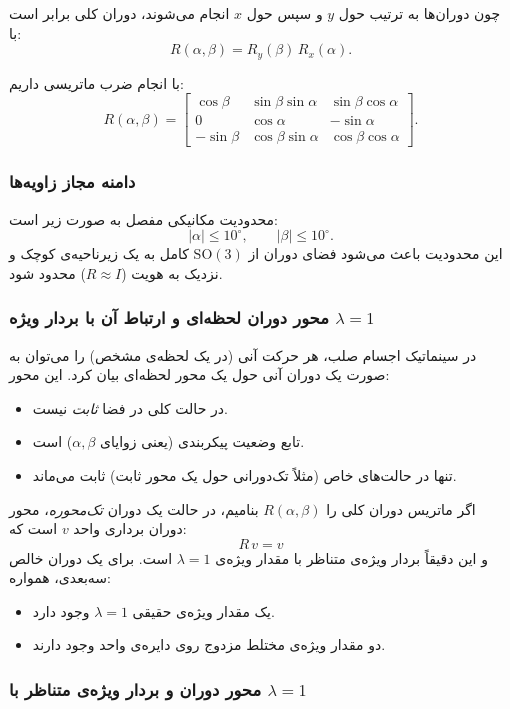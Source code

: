 \documentclass{article}
\begin{document}
چون دوران‌ها به ترتیب حول \(y\) و سپس حول \(x\) انجام می‌شوند، دوران کلی برابر است با:
\[
R(\alpha,\beta) = R_y(\beta)\,R_x(\alpha).
\]

با انجام ضرب ماتریسی داریم:
\[
R(\alpha,\beta) =
\begin{bmatrix}
	\cos\beta & \sin\beta\sin\alpha & \sin\beta\cos\alpha\\[4pt]
	0 & \cos\alpha & -\sin\alpha\\[4pt]
	-\sin\beta & \cos\beta\sin\alpha & \cos\beta\cos\alpha
\end{bmatrix}.
\]

\subsubsection{دامنه مجاز زاویه‌ها}

محدودیت مکانیکی مفصل به صورت زیر است:
\[
|\alpha|\le 10^\circ,\qquad |\beta|\le 10^\circ.
\]
این محدودیت باعث می‌شود فضای دوران از \(\mathrm{SO}(3)\) کامل به یک زیرناحیه‌ی کوچک و نزدیک به هویت (\(R\approx I\)) محدود شود.

\subsubsection{محور دوران لحظه‌ای و ارتباط آن با بردار ویژه \texorpdfstring{$\lambda=1$}{lambda=1}}


در سینماتیک اجسام صلب، هر حرکت آنی (در یک لحظه‌ی مشخص) را می‌توان به صورت یک دوران آنی حول یک محور لحظه‌ای بیان کرد. این محور:
\begin{itemize}
	\item در حالت کلی در فضا \emph{ثابت} نیست.
	\item تابع وضعیت پیکربندی (یعنی زوایای \(\alpha,\beta\)) است.
	\item تنها در حالت‌های خاص (مثلاً تک‌دورانی حول یک محور ثابت) ثابت می‌ماند.
\end{itemize}

اگر ماتریس دوران کلی را \(R(\alpha,\beta)\) بنامیم، در حالت یک دوران \emph{تک‌محوره}، محور دوران برداری واحد \(v\) است که:
\[
R\,v = v
\]
و این دقیقاً بردار ویژه‌ی متناظر با مقدار ویژه‌ی \(\lambda = 1\) است. برای یک دوران خالص سه‌بعدی، همواره:
\begin{itemize}
	\item یک مقدار ویژه‌ی حقیقی \(\lambda = 1\) وجود دارد.
	\item دو مقدار ویژه‌ی مختلط مزدوج روی دایره‌ی واحد وجود دارند.
\end{itemize}

\subsubsection{محور دوران و بردار ویژه‌ی متناظر با \texorpdfstring{$\lambda=1$}{lambda=1}}
\end{document}
